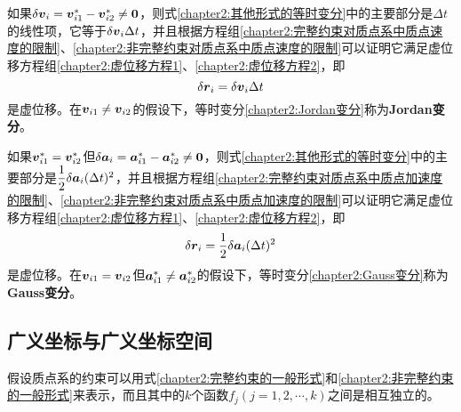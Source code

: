 如果$\delta \boldsymbol{v}_i = \boldsymbol{v}_{i1}^*-\boldsymbol{v}_{i2}^*\neq \boldsymbol{0}$，则式\eqref{chapter2:其他形式的等时变分}中的主要部分是$\Delta t$的线性项，它等于$\delta\boldsymbol{v}_i\Delta t$，并且根据方程组\eqref{chapter2:完整约束对质点系中质点速度的限制}、\eqref{chapter2:非完整约束对质点系中质点速度的限制}可以证明它满足虚位移方程组\eqref{chapter2:虚位移方程1}、\eqref{chapter2:虚位移方程2}，即
\begin{equation}
	\delta \boldsymbol{r}_i = \delta \boldsymbol{v}_i\Delta t \label{chapter2:Jordan变分}
\end{equation}
是虚位移。在$\boldsymbol{v}_{i1}\neq \boldsymbol{v}_{i2}$的假设下，等时变分\eqref{chapter2:Jordan变分}称为{\bf Jordan变分}。

如果$\boldsymbol{v}_{i1}^*=\boldsymbol{v}_{i2}^*$但$\delta \boldsymbol{a}_i = \boldsymbol{a}_{i1}^*-\boldsymbol{a}_{i2}^*\neq \boldsymbol{0}$，则式\eqref{chapter2:其他形式的等时变分}中的主要部分是$\dfrac12 \delta\boldsymbol{a}_i(\Delta t)^2$，并且根据方程组\eqref{chapter2:完整约束对质点系中质点加速度的限制}、\eqref{chapter2:非完整约束对质点系中质点加速度的限制}可以证明它满足虚位移方程组\eqref{chapter2:虚位移方程1}、\eqref{chapter2:虚位移方程2}，即
\begin{equation}
	\delta \boldsymbol{r}_i = \frac12 \delta \boldsymbol{a}_i(\Delta t)^2 \label{chapter2:Gauss变分}
\end{equation}
是虚位移。在$\boldsymbol{v}_{i1}=\boldsymbol{v}_{i2}$但$\boldsymbol{a}_{i1}^*\neq \boldsymbol{a}_{i2}^*$的假设下，等时变分\eqref{chapter2:Gauss变分}称为{\bf Gauss变分}。


\subsection{广义坐标与广义坐标空间}\label{chapter2:subsection-广义坐标与位形空间}

假设质点系的约束可以用式\eqref{chapter2:完整约束的一般形式}和\eqref{chapter2:非完整约束的一般形式}来表示，而且其中的$k$个函数$f_j(j=1,2,\cdots,k)$之间是相互独立的。

